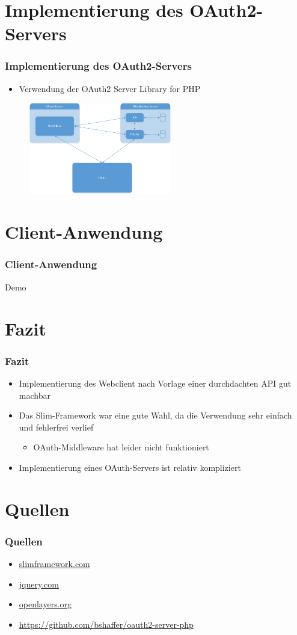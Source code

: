 \section{Implementierung des OAuth2-Servers}
\begin{frame}
	\frametitle*{Implementierung des OAuth2-Servers}
	\begin{itemize}
		\item Verwendung der \glqq OAuth2 Server Library for PHP\grqq
	\end{itemize}
	\begin{figure}
		\centering
		\includegraphics[height=40mm]{pics/Architektur.png}
	\end{figure}
\end{frame}

\section{Client-Anwendung}
\begin{frame}
	\frametitle*{Client-Anwendung}
	Demo
\end{frame}

\section{Fazit}
\begin{frame}
	\frametitle*{Fazit}
	\begin{itemize}
		\item Implementierung des Webclient nach Vorlage einer durchdachten API gut machbar
		\item Das Slim-Framework war eine gute Wahl, da die Verwendung sehr einfach und fehlerfrei verlief
		\begin{itemize}
			\item OAuth-Middleware hat leider nicht funktioniert
		\end{itemize}
		\item Implementierung eines OAuth-Servers ist relativ kompliziert
	\end{itemize}
\end{frame}


\section{Quellen}
\begin{frame}
	\frametitle*{Quellen}
	\begin{itemize}
		\item \url{slimframework.com}
		\item \url{jquery.com}
		\item \url{openlayers.org}
		\item \url{https://github.com/bshaffer/oauth2-server-php}
	\end{itemize}
\end{frame}
